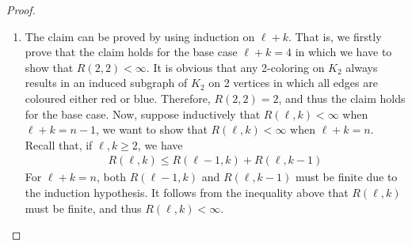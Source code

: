 \begin{proof}
\begin{enumerate}
        Similarly, we can reason that when $|B| \geq R(k,\ell-1)$ then $K_{n}$ has either an induced subgraph of $K_{n}$ on $\ell$ vertices in which all edges are coloured red or an induced subgraph $K_{n}$ on $k$ vertices in which all edges are coloured blue. Therefore, the proof is finished.

        \item The claim can be proved by using induction on $\ell+k$. That is, we firstly prove that the claim holds for the base case $\ell+k=4$ in which we have to show that $R(2,2) < \infty$. It is obvious that any 2-coloring on $K_{2}$ always results in an induced subgraph of $K_{2}$ on 2 vertices in which all edges are coloured either red or blue. Therefore, $R(2,2)=2$, and thus the claim holds for the base case. Now, suppose inductively that $R(\ell,k) < \infty$ when $\ell+k=n-1$, we want to show that $R(\ell,k) < \infty$ when $\ell+k=n$. Recall that, if $\ell,k \geq 2$, we have
        \begin{align*}
            R(\ell,k) \leq R(\ell-1,k) + R(\ell,k-1)
        \end{align*}
        For $\ell+k=n$, both $R(\ell-1,k)$ and $R(\ell,k-1)$ must be finite due to the induction hypothesis. It follows from the inequality above that $R(\ell,k)$ must be finite, and thus $R(\ell,k) < \infty$.
    \end{enumerate}
\end{proof}

